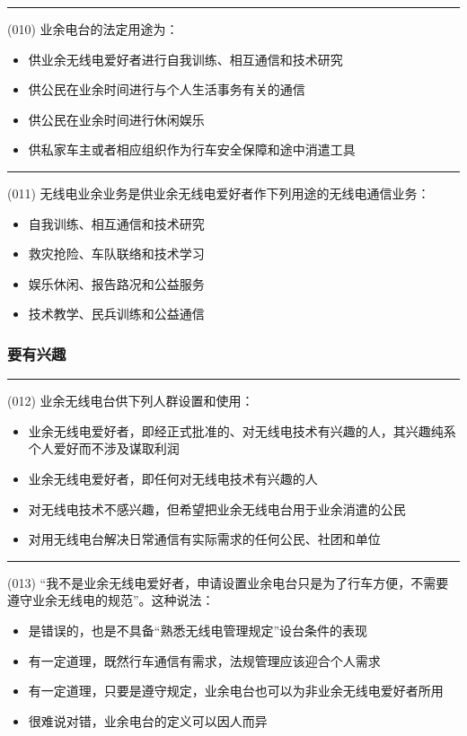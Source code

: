 \documentclass[twocolumn,hyperref,UTF8]{ctexart}  %
\begin{document}
\noindent\rule{0.5\textwidth}{1pt}
\heiti (010) 业余电台的法定用途为： \songti {\color{gray} [LK0008] }
\begin{itemize}
	\item  供业余无线电爱好者进行自我训练、相互通信和技术研究
	\item  供公民在业余时间进行与{\color{red}个人生活事务}有关的通信
	\item  供公民在业余时间进行{\color{red}休闲娱乐}
	\item  供私家车主或者相应组织作为行车安全保障和途中{\color{red}消遣}工具
\end{itemize}


\noindent\rule{0.5\textwidth}{1pt}
\heiti (011) 无线电业余业务是供业余无线电爱好者作下列用途的无线电通信业务： \songti {\color{gray} [LK0111] }
\begin{itemize}
	\item  自我训练、相互通信和技术研究
	\item  救灾抢险、车队联络和技术学习
	\item  娱乐休闲、报告路况和公益服务
	\item  技术教学、民兵训练和公益通信
\end{itemize}


\vspace{12pt}
\subsubsection{要有兴趣}


\noindent\rule{0.5\textwidth}{1pt}
\heiti (012) 业余无线电台供下列人群设置和使用： \songti {\color{gray} [LK0009] }
\begin{itemize}
	\item  业余无线电爱好者，即经正式批准的、对无线电技术有兴趣的人，其兴趣纯系个人爱好而不涉及谋取利润
	\item  业余无线电爱好者，即{\color{red}任何}对无线电技术有兴趣的人
	\item  对无线电技术{\color{red}不感兴趣}，但希望把业余无线电台用于业余{\color{red}消遣}的公民
	\item  对用无线电台解决{\color{red}日常通信}有实际需求的任何公民、社团和单位
\end{itemize}


\noindent\rule{0.5\textwidth}{1pt}
\heiti (013) “我不是业余无线电爱好者，申请设置业余电台只是为了行车方便，不需要遵守业余无线电的规范”。这种说法： \songti {\color{gray} [LK0051] }
\begin{itemize}
	\item  是错误的，也是不具备“熟悉无线电管理规定”设台条件的表现
	\item  有一定道理，既然行车通信有需求，法规管理应该迎合个人需求
	\item  有一定道理，只要是遵守规定，业余电台也可以为非业余无线电爱好者所用
	\item  很难说对错，业余电台的定义可以因人而异
\end{itemize}
\end{document}
